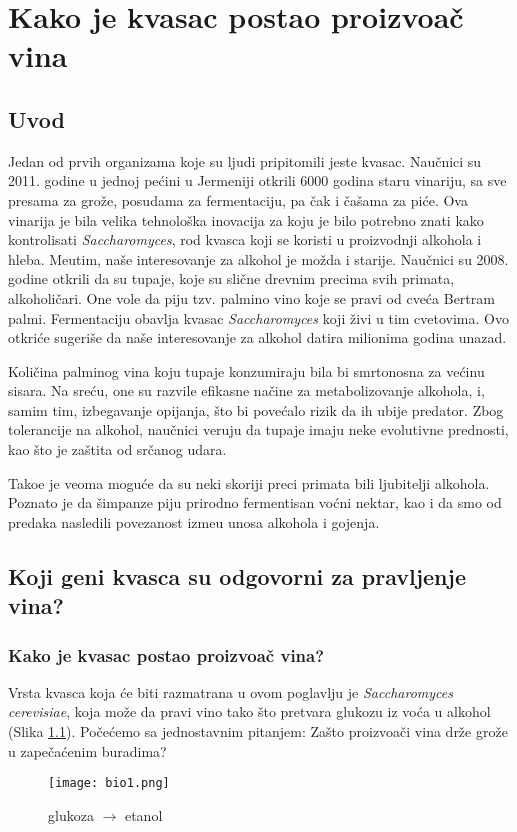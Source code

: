 \chapter{Kako je kvasac postao proizvo\dj ač vina}
\setbookcodestyle

\section{Uvod}

Jedan od prvih organizama koje su ljudi pripitomili jeste kvasac. Naučnici su 2011. godine u jednoj pećini u Jermeniji otkrili 6000 godina staru vinariju, sa sve presama za gro\v z\dj e, posudama za fermentaciju, pa čak i čašama za piće. Ova vinarija je bila velika tehnološka inovacija za koju je bilo potrebno znati kako kontrolisati \textit{Saccharomyces}, rod kvasca koji se koristi u proizvodnji alkohola i hleba. Me\dj utim, naše interesovanje za alkohol je možda i starije. Naučnici su 2008. godine otkrili da su tupaje, koje su slične drevnim precima svih primata, alkoholičari.  One vole da piju tzv. palmino vino koje se pravi od cveća Bertram palmi. Fermentaciju obavlja kvasac \textit{Saccharomyces} koji živi u tim cvetovima. Ovo otkriće sugeriše da naše interesovanje za alkohol datira milionima godina unazad.

Količina palminog vina koju tupaje konzumiraju bila bi smrtonosna za većinu sisara. Na sreću, one su razvile efikasne načine za metabolizovanje alkohola, i, samim tim, izbegavanje opijanja, što bi povećalo rizik da ih ubije predator.
Zbog tolerancije na alkohol, naučnici veruju da tupaje imaju neke evolutivne prednosti, kao što je zaštita od srčanog udara.

Tako\dj e je veoma moguće da su neki skoriji preci primata bili ljubitelji alkohola. Poznato je da šimpanze piju prirodno fermentisan voćni nektar, kao i da smo od predaka nasledili povezanost izme\dj u unosa alkohola i gojenja. 

\section{Koji geni kvasca su odgovorni za pravljenje vina?}
\subsection{Kako je kvasac postao proizvo\dj ač vina?}

Vrsta kvasca koja će biti razmatrana u ovom poglavlju je  \emph{Saccharomyces cerevisiae}, koja može da pravi vino tako što pretvara glukozu iz voća u alkohol (Slika \ref{slika 1}). Počećemo sa jednostavnim pitanjem: Zašto proizvo\dj ači vina drže grož\dj e u zapečaćenim buradima?
\begin{figure}[h]
    \centering
    \texttt{[image: bio1.png]}
    \caption{glukoza $\rightarrow$ etanol}
    \label{slika 1}
\end{figure}

